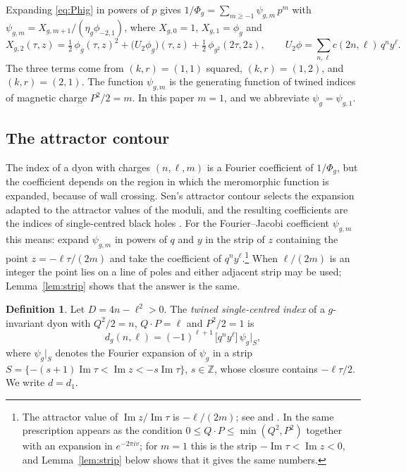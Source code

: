 \documentclass[11pt]{amsart}
\theoremstyle{definition}
\newtheorem{definition}[theorem]{Definition}
\newcommand{\ZZ}{\mathbb{Z}}
\begin{document}
Expanding \eqref{eq:Phig} in powers of $p$ gives $1/\Phi_g=\sum_{m\ge-1}\psi_{g,m}\,p^m$ with $\psi_{g,m}=X_{g,m+1}/(\eta_g\phi_{-2,1})$, where $X_{g,0}=1$, $X_{g,1}=\phi_g$ and
\begin{equation}\label{eq:X2}
X_{g,2}(\tau,z)=\tfrac12\,\phi_g(\tau,z)^2+\bigl(U_2\phi_g\bigr)(\tau,z)+\tfrac12\,\phi_{g^2}(2\tau,2z),\qquad U_2\phi=\sum_{n,\ell}c(2n,\ell)\,q^ny^\ell .
\end{equation}
The three terms come from $(k,r)=(1,1)$ squared, $(k,r)=(1,2)$, and $(k,r)=(2,1)$. The function $\psi_{g,m}$ is the generating function of twined indices of magnetic charge $P^2/2=m$. In this paper $m=1$, and we abbreviate $\psi_g=\psi_{g,1}$.

\subsection{The attractor contour}
The index of a dyon with charges $(n,\ell,m)$ is a Fourier coefficient of $1/\Phi_g$, but the coefficient depends on the region in which the meromorphic function is expanded, because of wall crossing. Sen's attractor contour selects the expansion adapted to the attractor values of the moduli, and the resulting coefficients are the indices of single-centred black holes \cite{Sen07,CV08,BSS09}. For the Fourier--Jacobi coefficient $\psi_{g,m}$ this means: expand $\psi_{g,m}$ in powers of $q$ and $y$ in the strip of $z$ containing the point $z=-\ell\tau/(2m)$ and take the coefficient of $q^ny^\ell$.\footnote{The attractor value of $\operatorname{Im}z/\operatorname{Im}\tau$ is $-\ell/(2m)$; see \cite[Section~8]{Sen07} and \cite[Section~2]{BSS09}. In \cite{GSSV23} the same prescription appears as the condition $0\le Q\cdot P\le\min(Q^2,P^2)$ together with an expansion in $e^{-2\pi iv}$; for $m=1$ this is the strip $-\operatorname{Im}\tau<\operatorname{Im}z<0$, and Lemma~\ref{lem:strip} below shows that it gives the same numbers.} When $\ell/(2m)$ is an integer the point lies on a line of poles and either adjacent strip may be used; Lemma~\ref{lem:strip} shows that the answer is the same.

\begin{definition}\label{def:index}
Let $D=4n-\ell^2>0$. The \emph{twined single-centred index} of a $g$-invariant dyon with $Q^2/2=n$, $Q\cdot P=\ell$ and $P^2/2=1$ is
\[
d_g(n,\ell)=(-1)^{\ell+1}\,\bigl[q^ny^\ell\bigr]\,\psi_g\big|_{S},
\]
where $\psi_g|_S$ denotes the Fourier expansion of $\psi_g$ in a strip $S=\{-(s+1)\operatorname{Im}\tau<\operatorname{Im}z<-s\operatorname{Im}\tau\}$, $s\in\ZZ$, whose closure contains $-\ell\tau/2$. We write $d=d_1$.
\end{definition}
\end{document}

